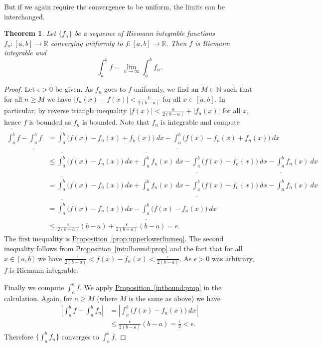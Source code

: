 \documentclass[12pt]{book}
\newcommand{\abs}[1]{\left\lvert {#1} \right\rvert}
\newcommand{\R}{{\mathbb{R}}}
\newcommand{\N}{{\mathbb{N}}}
\theoremstyle{plain}
\newtheorem{thm}{Theorem}[section]
\theoremstyle{remark}
\theoremstyle{definition}
\theoremstyle{exercise}
\theoremstyle{example}
\newcommand{\propref}[1]{\hyperref[#1]{Proposition~\ref*{#1}}}
\begin{document}
But
if we again require the convergence to be uniform, the limits can
be interchanged.

\begin{thm} \label{integralinterchange:thm}
Let $\{ f_n \}$ be a sequence of Riemann integrable
functions
$f_n \colon [a,b] \to \R$
converging uniformly to $f \colon [a,b]
\to \R$.  Then $f$ is Riemann integrable and
\begin{equation*}
\int_a^b f = \lim_{n\to\infty} \int_a^b f_n .
\end{equation*}
\end{thm}

\begin{proof}
Let $\epsilon > 0$ be given.
As $f_n$ goes to $f$ uniformly, we find an $M \in \N$ such that
for all $n \geq M$ we have 
$\abs{f_n(x)-f(x)} < \frac{\epsilon}{2(b-a)}$ for all $x \in [a,b]$.
In particular, by reverse triangle inequality
$\abs{f(x)} < \frac{\epsilon}{2(b-a)} + \abs{f_n(x)}$ for all $x$,
hence $f$ is bounded
as $f_n$ is bounded.
Note that $f_n$ is integrable and compute
\begin{equation*}
\begin{split}
\overline{\int_a^b} f
-
\underline{\int_a^b} f
& =
\overline{\int_a^b} \bigl( f(x) - f_n(x) + f_n(x) \bigr)~dx
-
\underline{\int_a^b} \bigl( f(x) - f_n(x) + f_n(x) \bigr)~dx
\\
& \leq
\overline{\int_a^b} \bigl( f(x) - f_n(x) \bigr)~dx +  \overline{\int_a^b} f_n(x) ~dx
-
\underline{\int_a^b} \bigl( f(x) - f_n(x) \bigr)~dx -  \underline{\int_a^b} f_n(x) ~dx
\\
& =
\overline{\int_a^b} \bigl( f(x) - f_n(x) \bigr)~dx +  \int_a^b f_n(x) ~dx
-
\underline{\int_a^b} \bigl( f(x) - f_n(x) \bigr)~dx -  \int_a^b f_n(x) ~dx
\\
& =
\overline{\int_a^b} \bigl( f(x) - f_n(x) \bigr)~dx
-
\underline{\int_a^b} \bigl( f(x) - f_n(x) \bigr)~dx
\\
& \leq
\frac{\epsilon}{2(b-a)} (b-a) + 
\frac{\epsilon}{2(b-a)} (b-a) = \epsilon .
\end{split}
\end{equation*}
The first inequality is \propref{prop:upperlowerlinineq}.
The second inequality follows from \propref{intulbound:prop} and 
the fact that for all $x \in [a,b]$ we have
$\frac{-\epsilon}{2(b-a)} < f(x)-f_n(x) < \frac{\epsilon}{2(b-a)}$.
As $\epsilon > 0$ was arbitrary, $f$ is Riemann integrable.

Finally we compute $\int_a^b f$.  We apply \propref{intbound:prop}
in the calculation.  Again, for $n \geq M$ (where $M$ is the same as above) we have
\begin{equation*}
\begin{split}
\abs{\int_a^b f - \int_a^b f_n} & = 
\abs{ \int_a^b \bigl(f(x) - f_n(x)\bigr)~dx}
\\
& \leq
\frac{\epsilon}{2(b-a)} (b-a) = \frac{\epsilon}{2} < \epsilon .
\end{split}
\end{equation*}
Therefore $\{ \int_a^b f_n \}$ converges to $\int_a^b f$.
\end{proof}
\end{document}

